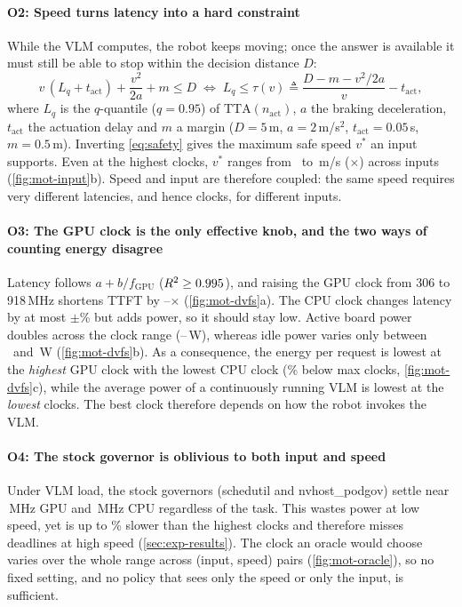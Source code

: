 \documentclass[conference]{IEEEtran}
\newcommand{\Lq}{L_{q}}
\newcommand{\nact}{n_{\mathrm{act}}}
\begin{document}
\paragraph{O2: Speed turns latency into a hard constraint}
While the VLM computes, the robot keeps moving; once the answer is available it must still be able
to stop within the decision distance $D$:
\begin{equation}
  v\,(\Lq + t_{\mathrm{act}}) + \frac{v^2}{2a} + m \le D
  \;\Longleftrightarrow\;
  \Lq \le \tau(v) \triangleq \frac{D - m - v^2/2a}{v} - t_{\mathrm{act}},
  \label{eq:safety}
\end{equation}
where $\Lq$ is the $q$-quantile ($q{=}0.95$) of $\mathrm{TTA}(\nact)$, $a$ the braking deceleration,
$t_{\mathrm{act}}$ the actuation delay and $m$ a margin
($D{=}5$\,m, $a{=}2$\,m/s$^2$, $t_{\mathrm{act}}{=}0.05$\,s, $m{=}0.5$\,m).
Inverting \cref{eq:safety} gives the maximum safe speed $v^*$ an input supports. Even at the highest
clocks, $v^*$ ranges from \VstarMin\ to \VstarMax\,m/s (\VstarRatio$\times$) across inputs
(\cref{fig:mot-input}b). Speed and input are therefore coupled: the same speed requires very different
latencies, and hence clocks, for different inputs.

\paragraph{O3: The GPU clock is the only effective knob, and the two ways of counting energy disagree}
Latency follows $a + b/f_{\mathrm{GPU}}$ ($R^2 \ge 0.995$), and raising the GPU clock from 306 to
918\,MHz shortens TTFT by \GpuSpMin--\GpuSpMax$\times$ (\cref{fig:mot-dvfs}a). The CPU clock changes
latency by at most $\pm$\CpuEffect\% but adds power, so it should stay low.
Active board power doubles across the clock range (\PActMin--\PActMax\,W), whereas idle power varies
only between \PIdleMin\ and \PIdleMax\,W (\cref{fig:mot-dvfs}b). As a consequence, the energy per request is
lowest at the \emph{highest} GPU clock with the lowest CPU clock (\EreqBest\% below max clocks,
\cref{fig:mot-dvfs}c), while the average power of a continuously running VLM is lowest at the
\emph{lowest} clocks. The best clock therefore depends on how the robot invokes the VLM.

\paragraph{O4: The stock governor is oblivious to both input and speed}
Under VLM load, the stock governors (schedutil and nvhost\_podgov) settle near
\GovGpu\,MHz GPU and \GovCpu\,MHz CPU regardless of the task. This wastes power at low speed, yet is
up to \GovSlowMax\% slower than the highest clocks and therefore misses deadlines at high speed
(\cref{sec:exp-results}). The clock an oracle would choose varies over the whole range across
(input, speed) pairs (\cref{fig:mot-oracle}), so no fixed setting, and no policy that sees only the
speed or only the input, is sufficient.
\end{document}

